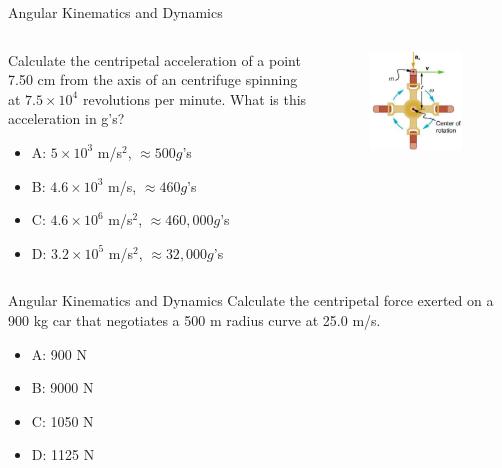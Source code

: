 \documentclass{beamer}
\begin{document}
\begin{frame}{Angular Kinematics and Dynamics}
\begin{columns}[T]
\begin{column}{0.45\textwidth}
\small
Calculate the centripetal acceleration of a point 7.50 cm from the axis of an centrifuge spinning at $7.5 \times 10^4$ revolutions per minute.  What is this acceleration in g's?
\begin{itemize}
\item A: $5\times 10^3$ m/s$^2$, $\approx 500 g$'s
\item B: $4.6\times 10^3$ m/s, $\approx 460 g$'s
\item C: $4.6\times 10^6$ m/s$^2$, $\approx 460,000 g$'s
\item D: $3.2\times 10^5$ m/s$^2$, $\approx 32,000 g$'s
\end{itemize}
\end{column}
\begin{column}{0.55\textwidth}
\begin{figure}
\centering
\includegraphics[width=0.9\textwidth]{figures/centrifuge.png}
\end{figure}
\end{column}
\end{columns}
\end{frame}

\begin{frame}{Angular Kinematics and Dynamics}
Calculate the centripetal force exerted on a 900 kg car that negotiates a 500 m radius curve at 25.0 m/s.
\begin{itemize}
\item A: 900 N
\item B: 9000 N
\item C: 1050 N
\item D: 1125 N
\end{itemize}
\end{frame}
\end{document}
